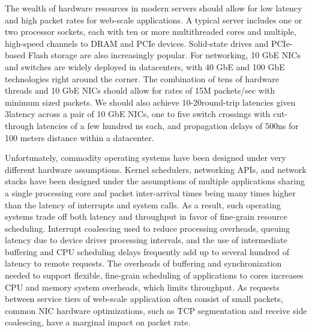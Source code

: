The wealth of hardware resources in modern servers should allow for
low latency and high packet rates for web-scale applications.  A
typical server includes one or two processor sockets, each with ten or
more multithreaded cores and multiple, high-speed channels to DRAM and
PCIe devices. Solid-state drives and PCIe-based Flash storage are also
increasingly popular. For networking, 10 GbE NICs and switches are
widely deployed in datacenters, with 40 GbE and 100 GbE technologies
right around the corner. The combination of tens of hardware threads
and 10 GbE NICs should allow for rates of 15M packets/sec with minimum
sized packets.  We should also achieve 10-20\microsecond round-trip
latencies given 3\microsecond latency across a pair of 10 GbE NICs,
one to five switch crossings with cut-through latencies of a few
hundred ns each, and propagation delays of 500ns for 100 meters
distance within a datacenter.


Unfortunately, commodity operating systems have been designed under
very different hardware assumptions. Kernel schedulers, networking
APIs, and network stacks have been designed under the assumptions of
multiple applications sharing a single processing core and packet
inter-arrival times being many times higher than the latency of interrupts
and system calls.  As a result, such operating systems trade off both
latency and throughput in favor of fine-grain resource scheduling.
Interrupt coalescing used to reduce processing overheads, queuing
latency due to device driver processing intervals, and the use of
intermediate buffering and CPU scheduling delays frequently add up to
several hundred \microsecond of latency to remote requests.  The
overheads of buffering and synchronization needed to support flexible,
fine-grain scheduling of applications to cores increases CPU and
memory system overheads, which limits throughput.  As requests between
service tiers of web-scale application often consist of small packets,
common NIC hardware optimizations, such as TCP segmentation and
receive side coalescing, have a marginal impact on packet rate.



